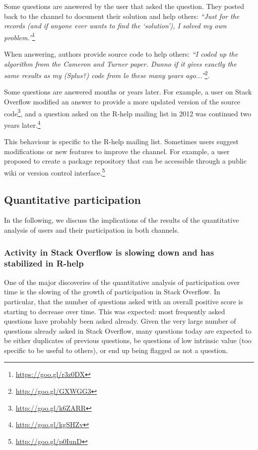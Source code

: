 \documentclass[smallextended]{svjour3}       %
\newcommand{\SO}{Stack Overflow\xspace}
\newcommand{\RH}{R-help\xspace}
\begin{document}
\begin{description}[itemsep=2pt, topsep=0pt, leftmargin=1em, parsep=0pt]
\item[I answered my own question:] Some questions are answered by the user that asked the question. They posted back to the channel to document their solution and help others: \textit{``Just for the records (and if anyone ever wants to find the `solution'), I solved my own problem.''}\footnote{\url{https://goo.gl/r3z0DX}} 
 
\item[I did it for you:] When answering, authors provide source code to help others: \textit{``I coded up the algorithm from the Cameron and Turner paper. Dunno if it gives exactly the same results as my (Splus?) code from lo these many years ago...''}\footnote{\url{http://goo.gl/GXWGG3}}.

\item[Updated or continued years later:] Some questions are answered months or years later.
For example, a user on \SO modified an answer to provide a more updated version of the source code\footnote{\url{http://goo.gl/k6ZARR}}, and a {question asked on the \RH mailing list in 2012 was continued two years later.}\footnote{\url{http://goo.gl/kgSHZv}}

\item[Ideas to improve the channel:] This behaviour is specific to the \RH mailing list. Sometimes users suggest modifications or new features to improve the channel. For example, a {user proposed to create a package repository that can be accessible through a public wiki or version control interface.}\footnote{\url{http://goo.gl/p0IunD}}
\end{description}

\subsection{Quantitative participation}

In the following, we discuss the implications of the results of the quantitative analysis of users and their
participation in both channels.


\subsubsection{Activity in \SO is slowing down and has stabilized in \RH}

One of the major discoveries of the quantitative analysis of participation over time is the slowing of the growth of
participation in \SO. In particular, that the number of questions asked with an overall positive score is starting to 
decrease over time. This was expected: most frequently asked questions have probably been asked already.  Given the
very large number of questions already asked in \SO, many questions today are expected to be either duplicates of previous
questions, be questions of low intrinsic value (too specific to be useful to others), or end up being flagged as
not a question. 
\end{document}
